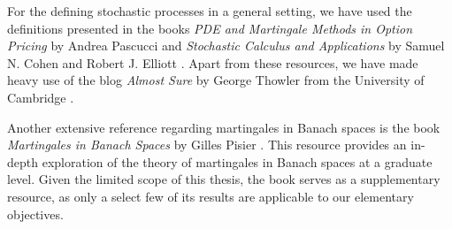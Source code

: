 For the defining stochastic processes in a general setting, we have used the definitions presented in the books \textit{PDE and Martingale Methods in Option Pricing} by Andrea Pascucci \cite{Pascucci_2011} and \textit{Stochastic Calculus and Applications} by Samuel N. Cohen and Robert J. Elliott \cite{Elliott_Cohen_1982}. Apart from these resources, we have made heavy use of the blog \textit{Almost Sure} by George Thowler from the University of Cambridge \cite{Thowler}.

Another extensive reference regarding martingales in Banach spaces is the book \textit{Martingales in Banach Spaces} by Gilles Pisier \cite{pisier_2016}. This resource provides an in-depth exploration of the theory of martingales in Banach spaces at a graduate level. Given the limited scope of this thesis, the book serves as a supplementary resource, as only a select few of its results are applicable to our elementary objectives.
